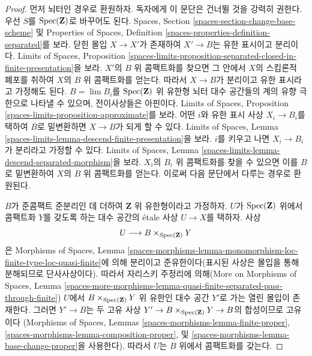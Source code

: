 \begin{proof}
먼저 뇌터인 경우로 환원하자. 독자에게 이 문단은 건너뛸 것을
강력히 권한다. 우선 $S$를 $\mathop{\mathrm{Spec}}(\mathbf{Z})$로 바꾸어도 된다.
Spaces, Section \ref{spaces-section-change-base-scheme} 및
Properties of Spaces, Definition
\ref{spaces-properties-definition-separated}를 보라.
닫힌 몰입 $X \to X'$가 존재하여 $X' \to B$는 유한 표시이고
분리이다. Limits of Spaces, Proposition
\ref{spaces-limits-proposition-separated-closed-in-finite-presentation}을
보라. $X'$의 $B$ 위 콤팩트화를 찾으면 그 안에서 $X$의 스킴론적
폐포를 취하여 $X$의 $B$ 위 콤팩트화를 얻는다. 따라서
$X \to B$가 분리이고 유한 표시라고 가정해도 된다.
$B = \lim B_i$를 $\mathop{\mathrm{Spec}}(\mathbf{Z})$ 위 유한형 뇌터 대수 공간들의
계의 유향 극한으로 나타낼 수 있으며, 전이사상들은 아핀이다.
Limits of Spaces, Proposition
\ref{spaces-limits-proposition-approximate}를 보라.
어떤 $i$와 유한 표시 사상 $X_i \to B_i$를 택하여 $B$로
밑변환하면 $X \to B$가 되게 할 수 있다. Limits of Spaces, Lemma
\ref{spaces-limits-lemma-descend-finite-presentation}을 보라.
$i$를 키우고 나면 $X_i \to B_i$가 분리라고 가정할 수 있다.
Limits of Spaces, Lemma
\ref{spaces-limits-lemma-descend-separated-morphism}을 보라.
$X_i$의 $B_i$ 위 콤팩트화를 찾을 수 있으면 이를 $B$로 밑변환하여
$X$의 $B$ 위 콤팩트화를 얻는다. 이로써 다음 문단에서 다루는
경우로 환원된다.

\medskip\noindent
$B$가 준콤팩트 준분리인 데 더하여 $\mathbf{Z}$ 위 유한형이라고
가정하자. $U$가 $\mathop{\mathrm{Spec}}(\mathbf{Z})$ 위에서 콤팩트화 $Y$를 갖도록
하는 대수 공간의 \'etale 사상 $U \to X$를 택하자. 사상
$$
U \longrightarrow B \times_{\mathop{\mathrm{Spec}}(\mathbf{Z})} Y
$$
은 Morphisms of Spaces, Lemma
\ref{spaces-morphisms-lemma-monomorphism-loc-finite-type-loc-quasi-finite}에
의해 분리이고 준유한이다(표시된 사상은 몰입을 통해 분해되므로
단사사상이다). 따라서 자리스키 주정리에 의해(More on Morphisms of
Spaces, Lemma
\ref{spaces-more-morphisms-lemma-quasi-finite-separated-pass-through-finite})
$U$에서 $B \times_{\mathop{\mathrm{Spec}}(\mathbf{Z})} Y$ 위 유한인 대수 공간 $Y'$로
가는 열린 몰입이 존재한다. 그러면 $Y' \to B$는 두 고유 사상
$Y' \to B \times_{\mathop{\mathrm{Spec}}(\mathbf{Z})} Y \to B$의 합성이므로 고유이다
(Morphisms of Spaces, Lemmas
\ref{spaces-morphisms-lemma-finite-proper},
\ref{spaces-morphisms-lemma-composition-proper}, 및
\ref{spaces-morphisms-lemma-base-change-proper}을 사용한다).
따라서 $U$는 $B$ 위에서 콤팩트화를 갖는다.


\end{proof}
